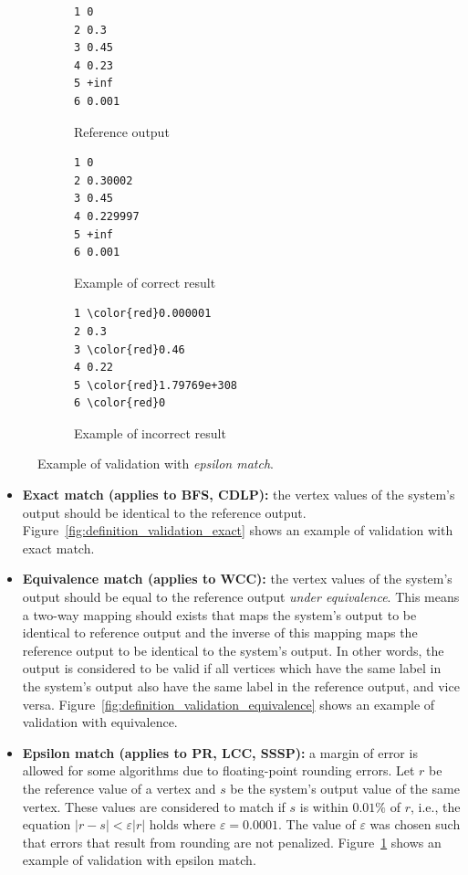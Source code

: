 \begin{figure}[h]
\centering
\begin{subfigure}{0.3\textwidth}
\begin{Verbatim}[frame=single]
1 0
2 0.3
3 0.45
4 0.23
5 +inf
6 0.001
\end{Verbatim}
\caption{Reference output}
\end{subfigure}
\begin{subfigure}{0.3\textwidth}
\begin{Verbatim}[frame=single]
1 0
2 0.30002
3 0.45
4 0.229997
5 +inf
6 0.001
\end{Verbatim}
\caption{Example of correct result}
\end{subfigure}
\begin{subfigure}{0.3\textwidth}
\begin{Verbatim}[frame=single,commandchars=\\\{\}]
1 \color{red}0.000001
2 0.3
3 \color{red}0.46
4 0.22
5 \color{red}1.79769e+308
6 \color{red}0
\end{Verbatim}
\caption{Example of incorrect result}
\end{subfigure}
\caption{Example of validation with \emph{epsilon match}.}
\label{fig:definition_validation_epsilon}
\end{figure}


\begin{itemize}

\item \textbf{Exact match (applies to BFS, CDLP):} the vertex values of the system's output should be identical to the reference output. Figure~\ref{fig:definition_validation_exact} shows an example of validation with exact match.

\item \textbf{Equivalence match (applies to WCC):} the vertex values of the system's output should be equal to the reference output \emph{under equivalence}. This means a two-way mapping should exists that maps the system's output to be identical to reference output and the inverse of this mapping maps the reference output to be identical to the system's output. In other words, the output is considered to be valid if all vertices which have the same label in the system's output also have the same label in the reference output, and vice versa. Figure~\ref{fig:definition_validation_equivalence} shows an example of validation with equivalence.

\item \textbf{Epsilon match (applies to PR, LCC, SSSP):} a margin of error is allowed for some algorithms due to floating-point rounding errors. Let $r$ be the reference value of a vertex and $s$ be the system's output value of the same vertex. These values are considered to match if $s$ is within $0.01\%$ of $r$, i.e., the equation $|r-s| < \varepsilon |r|$ holds where $\varepsilon=0.0001$. The value of $\varepsilon$ was chosen such that errors that result from rounding are not penalized. Figure~\ref{fig:definition_validation_epsilon} shows an example of validation with epsilon match.
\end{itemize}

